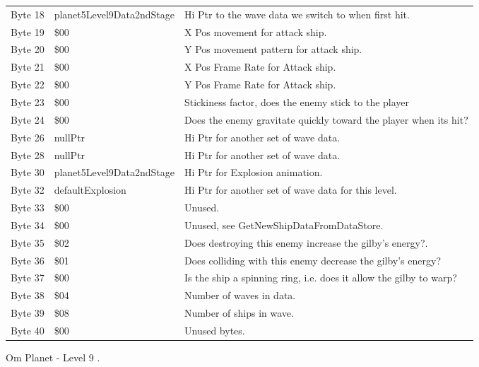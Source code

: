 \begin{figure}[H]
{\begin{adjustbox}{width=12cm}
\begin{tabular}{lll}
 Byte 18 & planet5Level9Data2ndStage & Hi Ptr to the wave data we switch to when first hit.               \\
 Byte 19 & \$00                       & X Pos movement for attack ship.                                    \\
 Byte 20 & \$00                       & Y Pos movement pattern for attack ship.                            \\
 Byte 21 & \$00                       & X Pos Frame Rate for Attack ship.                                  \\
 Byte 22 & \$00                       & Y Pos Frame Rate for Attack ship.                                  \\
 Byte 23 & \$00                       & Stickiness factor, does the enemy stick to the player              \\
 Byte 24 & \$00                       & Does the enemy gravitate quickly toward the player when its hit?   \\
 Byte 26 & nullPtr                   & Hi Ptr for another set of wave data.                               \\
 Byte 28 & nullPtr                   & Hi Ptr for another set of wave data.                               \\
 Byte 30 & planet5Level9Data2ndStage & Hi Ptr for Explosion animation.                                    \\
 Byte 32 & defaultExplosion          & Hi Ptr for another set of wave data for this level.                \\
 Byte 33 & \$00                       & Unused.                                                            \\
 Byte 34 & \$00                       & Unused, see GetNewShipDataFromDataStore.                           \\
 Byte 35 & \$02                       & Does destroying this enemy increase the gilby's energy?.           \\
 Byte 36 & \$01                       & Does colliding with this enemy decrease the gilby's energy?        \\
 Byte 37 & \$00                       & Is the ship a spinning ring, i.e. does it allow the gilby to warp? \\
 Byte 38 & \$04                       & Number of waves in data.                                           \\
 Byte 39 & \$08                       & Number of ships in wave.                                           \\
 Byte 40 & \$00                       & Unused bytes.                                                      \\
\bottomrule
\end{tabular}

  \end{adjustbox}

  }\caption*{Om Planet - Level 9
.}
\end{figure}

